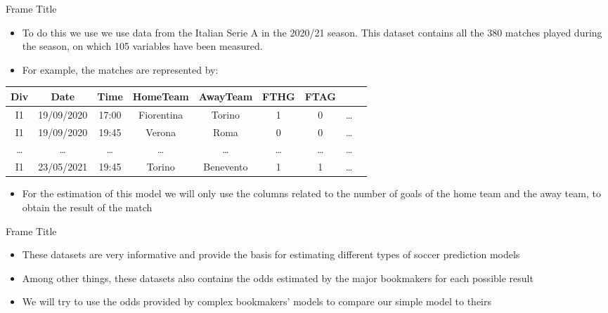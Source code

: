 \documentclass[aspectratio=169,xcolor=dvipsnames]{beamer}
\begin{document}
\begin{frame}{Frame Title}
\begin{itemize}

    \item To do this we use we use data from the Italian Serie A in the 2020/21 season. This dataset contains all the 380 matches played during the season, on which 105 variables have been measured. 
    
    \item For example, the matches are represented by:
\end{itemize}

    \begin{table}[ht]
    \centering
    \begin{tabular}{ccccccccc}
      \hline
      Div & Date & Time & HomeTeam & AwayTeam & FTHG & FTAG & \\ 
      \hline
      I1 & 19/09/2020 & 17:00 & Fiorentina & Torino &   1 &  0 & \dots \\ 
      I1 & 19/09/2020 & 19:45 & Verona & Roma &   0 &   0 & \dots \\ 
      \dots & \dots & \dots  & \dots & \dots & \dots & \dots & \dots \\ 
      I1 & 23/05/2021 & 19:45 & Torino & Benevento &   1 &   1 & \dots \\ 
       \hline
    \end{tabular}
    \end{table}

\begin{itemize}
    
    \item For the estimation of this model we will only use the columns related to the number of goals of the home team and the away team, to obtain the result of the match
\end{itemize}
    
\end{frame}

\begin{frame}{Frame Title}
\begin{itemize}

    \item These datasets are very informative and provide the basis for estimating different types of soccer prediction models
    
    \item Among other things, these datasets also contains the odds estimated by the major bookmakers for each possible result
    
    \item We will try to use the odds provided by complex bookmakers' models to compare our simple model to theirs
\end{itemize}
\end{frame}
\end{document}
